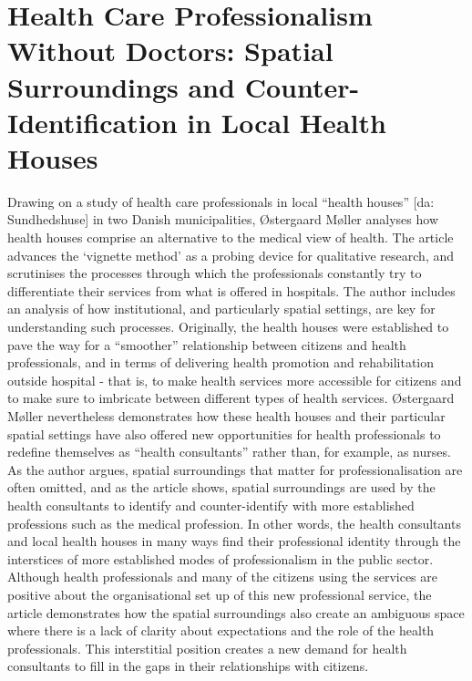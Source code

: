 \section{Health Care Professionalism Without Doctors: Spatial Surroundings and Counter-Identification in Local Health Houses}
Drawing on a study of health care professionals in local “health houses” [da: Sundhedshuse] in two Danish municipalities, Østergaard Møller analyses how health houses comprise an alternative to the medical view of health. The article advances the ‘vignette method’ as a probing device for qualitative research, and scrutinises the processes through which the professionals constantly try to differentiate their services from what is offered in hospitals. The author includes an analysis of how institutional, and particularly spatial settings, are key for understanding such processes.  Originally, the health houses were established to pave the way for a “smoother” relationship between citizens and health professionals, and in terms of delivering health promotion and rehabilitation outside hospital - that is, to make health services more accessible for citizens and to make sure to imbricate between different types of health services. Østergaard Møller nevertheless demonstrates how these health houses and their particular spatial settings have also offered new opportunities for health professionals to redefine themselves as “health consultants” rather than, for example, as nurses. As the author argues, spatial surroundings that matter for professionalisation are often omitted, and as the article shows, spatial surroundings are used by the health consultants to identify and counter-identify with more established professions such as the medical profession. In other words, the health consultants and local health houses in many ways find their professional identity through the interstices of more established modes of professionalism in the public sector. Although health professionals and many of the citizens using the services are positive about the organisational set up of this new professional service, the article demonstrates how the spatial surroundings also create an ambiguous space where there is a lack of clarity about expectations and the role of the health professionals. This interstitial position creates a new demand for health consultants to fill in the gaps in their relationships with citizens.

